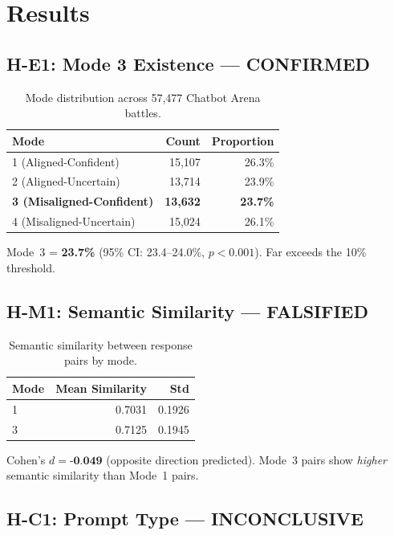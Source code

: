 \section{Results}

\subsection{H-E1: Mode 3 Existence --- CONFIRMED}

\begin{table}[h]
\centering
\caption{Mode distribution across 57,477 Chatbot Arena battles.}
\label{tab:mode_distribution}
\begin{tabular}{@{}lrr@{}}
\toprule
Mode & Count & Proportion \\
\midrule
1 (Aligned-Confident) & 15,107 & 26.3\% \\
2 (Aligned-Uncertain) & 13,714 & 23.9\% \\
\textbf{3 (Misaligned-Confident)} & \textbf{13,632} & \textbf{23.7\%} \\
4 (Misaligned-Uncertain) & 15,024 & 26.1\% \\
\bottomrule
\end{tabular}
\end{table}

Mode~3 = \textbf{23.7\%} (95\% CI: 23.4--24.0\%, $p<0.001$). Far exceeds the 10\% threshold.

\subsection{H-M1: Semantic Similarity --- FALSIFIED}

\begin{table}[h]
\centering
\caption{Semantic similarity between response pairs by mode.}
\label{tab:semantic_similarity}
\begin{tabular}{@{}lrr@{}}
\toprule
Mode & Mean Similarity & Std \\
\midrule
1 & 0.7031 & 0.1926 \\
3 & 0.7125 & 0.1945 \\
\bottomrule
\end{tabular}
\end{table}

Cohen's $d = \textbf{-0.049}$ (opposite direction predicted). Mode~3 pairs show \emph{higher} semantic similarity than Mode~1 pairs.

\subsection{H-C1: Prompt Type --- INCONCLUSIVE}

